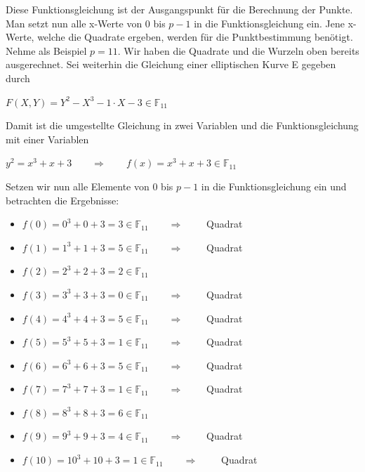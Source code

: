 Diese Funktionsgleichung ist der Ausgangspunkt für die Berechnung der Punkte. Man setzt nun alle x-Werte von $0$ bis $p - 1$ in die Funktionsgleichung ein. Jene x-Werte, welche die Quadrate ergeben, werden für die Punktbestimmung benötigt. Nehme als Beispiel $p = 11$. Wir haben die Quadrate und die Wurzeln oben bereits ausgerechnet. Sei weiterhin die Gleichung einer elliptischen Kurve E gegeben durch
\begin{center}
$F(X, Y) =  Y^{2} - X^{3} - 1 \cdot X - 3 \in \mathbb{F}_{11}$
\end{center}

Damit ist die umgestellte Gleichung in zwei Variablen und die Funktionsgleichung mit einer Variablen
\begin{center}
$y^{2} =  x^{3} + x + 3 \qquad \Longrightarrow \qquad f(x) =  x^{3} + x + 3 \in \mathbb{F}_{11}$
\end{center}
Setzen wir nun alle Elemente von $0$ bis $p - 1$ in die Funktionsgleichung ein und betrachten die Ergebnisse:

\begin{itemize}
\item $f(0) =  0^{3} + 0 + 3 = 3 \in \mathbb{F}_{11} \qquad \Longrightarrow \qquad$ Quadrat
\item $f(1) =  1^{3} + 1 + 3 = 5 \in \mathbb{F}_{11} \qquad \Longrightarrow \qquad$ Quadrat
\item $f(2) =  2^{3} + 2 + 3 = 2 \in \mathbb{F}_{11}$
\item $f(3) =  3^{3} + 3 + 3 = 0 \in \mathbb{F}_{11} \qquad \Longrightarrow \qquad$ Quadrat
\item $f(4) =  4^{3} + 4 + 3 = 5 \in \mathbb{F}_{11} \qquad \Longrightarrow \qquad$ Quadrat
\item $f(5) =  5^{3} + 5 + 3 = 1 \in \mathbb{F}_{11} \qquad \Longrightarrow \qquad$ Quadrat
\item $f(6) =  6^{3} + 6 + 3 = 5 \in \mathbb{F}_{11} \qquad \Longrightarrow \qquad$ Quadrat
\item $f(7) =  7^{3} + 7 + 3 = 1 \in \mathbb{F}_{11} \qquad \Longrightarrow \qquad$ Quadrat
\item $f(8) =  8^{3} + 8 + 3 = 6 \in \mathbb{F}_{11}$
\item $f(9) =  9^{3} + 9 + 3 = 4 \in \mathbb{F}_{11} \qquad \Longrightarrow \qquad$ Quadrat
\item $f(10) = 10^{3} + 10 + 3 = 1 \in \mathbb{F}_{11} \qquad \Longrightarrow \qquad$ Quadrat
\end{itemize}


